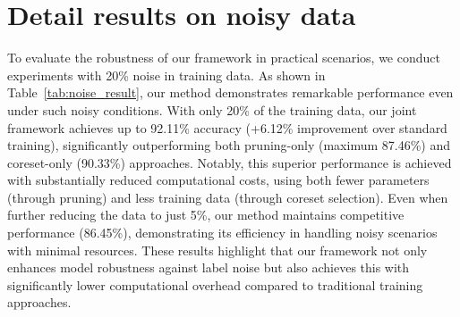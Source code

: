 \section{Detail results on noisy data}  
\label{appendix:noise_exp}  
To evaluate the robustness of our framework in practical scenarios, we conduct experiments with 20\% noise in training data. As shown in Table~\ref{tab:noise_result}, our method demonstrates remarkable performance even under such noisy conditions. With only 20\% of the training data, our joint framework achieves up to 92.11\% accuracy (+6.12\% improvement over standard training), significantly outperforming both pruning-only (maximum 87.46\%) and coreset-only (90.33\%) approaches. Notably, this superior performance is achieved with substantially reduced computational costs, using both fewer parameters (through pruning) and less training data (through coreset selection). Even when further reducing the data to just 5\%, our method maintains competitive performance (86.45\%), demonstrating its efficiency in handling noisy scenarios with minimal resources. These results highlight that our framework not only enhances model robustness against label noise but also achieves this with significantly lower computational overhead compared to traditional training approaches. 


